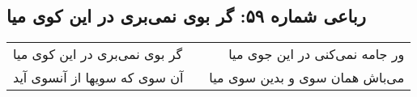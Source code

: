 \begin{center}
\section*{رباعی شماره ۵۹: گر بوی نمی‌بری در این کوی میا}
\label{sec:0059}
\begin{longtable}{l p{0.5cm} r}
گر بوی نمی‌بری در این کوی میا
&&
ور جامه نمی‌کنی در این جوی میا
\\
آن سوی که سویها از آنسوی آید
&&
می‌باش همان سوی و بدین سوی میا
\\
\end{longtable}
\end{center}
